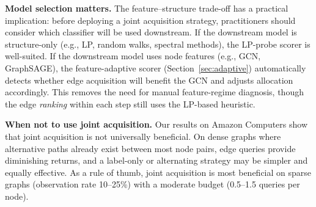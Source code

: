 \documentclass[12pt,a4paper,oneside]{report}
\begin{document}
\textbf{Model selection matters.} The feature--structure trade-off has a practical implication: before deploying a joint acquisition strategy, practitioners should consider which classifier will be used downstream. If the downstream model is structure-only (e.g., LP, random walks, spectral methods), the LP-probe scorer is well-suited. If the downstream model uses node features (e.g., GCN, GraphSAGE), the feature-adaptive scorer (Section~\ref{sec:adaptive}) automatically detects whether edge acquisition will benefit the GCN and adjusts allocation accordingly. This removes the need for manual feature-regime diagnosis, though the edge \emph{ranking} within each step still uses the LP-based heuristic.

\textbf{When not to use joint acquisition.} Our results on Amazon Computers show that joint acquisition is not universally beneficial. On dense graphs where alternative paths already exist between most node pairs, edge queries provide diminishing returns, and a label-only or alternating strategy may be simpler and equally effective. As a rule of thumb, joint acquisition is most beneficial on sparse graphs (observation rate 10--25\%) with a moderate budget (0.5--1.5 queries per node).
\end{document}
